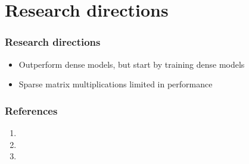 \documentclass{beamer}
\begin{document}
  
  \section{Research directions}
  \begin{frame}
    \frametitle{Research directions}
    \begin{itemize}
        \item Outperform dense models, but start by training dense models
        \item Sparse matrix multiplications limited in performance
    \end{itemize}
  \end{frame}


  \begin{frame}
    \frametitle{References}
    \begin{enumerate}
      \item {}
      \item {}
      \item {}
    \end{enumerate}
  \end{frame}
\end{document}
